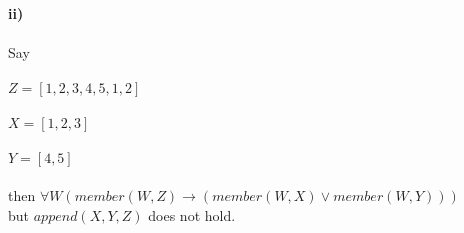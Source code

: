 \documentclass[12pt, a4paper]{article}
\begin{document}
\noindent \textbf{ii)}\\\\
\noindent \textnormal{Say}\\\\
$Z = [1,2,3,4,5,1,2]$\\\\
$X = [1,2,3]$\\\\
$Y = [4,5]$ \\\\
\noindent \textnormal{then } $\forall W ( member(W,Z) \longrightarrow (member(W,X) \vee member(W,Y)))$ \\
but $append(X,Y,Z)$ does not hold.
\end{document}
